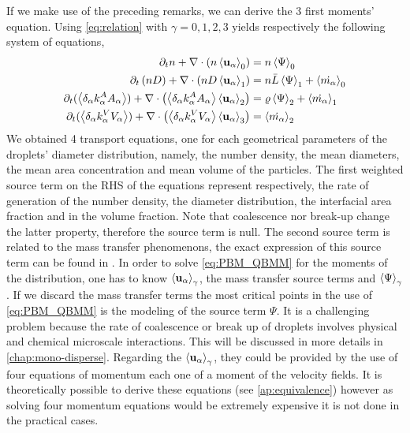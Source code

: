 If we make use of the preceding remarks, we can derive the 3 first moments' equation. 
Using \ref{eq:relation} with $\gamma = 0,1,2,3$ yields respectively the following system of equations,
\begin{align}
    \label{eq:PBM_QBMM3}
    \pddt n  
    + \nablab \cdot \left(n\gavg[0]{\textbf{u}_\alpha}\right) 
    &= n\gavg[0]{\Psi}\\
    \label{eq:PBEsize}
    \pddt \left(nD\right)
    + \nablab \cdot \left(nD\gavg[1]{\textbf{u}_\alpha}\right) 
    &= n\bar{L}\gavg[1]{\Psi}+ \gavg[0]{\dot{m_\alpha}} \\
    \label{eq:PBEarea} 
    \pddt ( \pavg{k_\alpha^A A_\alpha} ) 
    + \nablab \cdot \left( \pavg{k_\alpha^A A_\alpha} \gavg[2]{\textbf{u}_\alpha}\right) 
    &= \varrho\gavg[2]{\Psi} + \gavg[1]{\dot{m_\alpha}}\\
    \label{eq:PBEmass}
    \pddt (\pavg{ k_\alpha^V  V_\alpha} )
    + \nablab \cdot \left( \pavg{k_\alpha^V V_\alpha}  \gavg[3]{\textbf{u}_\alpha}\right) 
    &=  \gavg[2]{\dot{m_\alpha}}
\end{align}
We obtained 4 transport equations, one for each geometrical parameters of the droplets' diameter distribution, namely, the number density, the mean diameters, the mean area concentration and mean volume of the particles.
The first weighted source term on the RHS of the equations represent respectively, the rate of generation of the number density, the diameter distribution, the interfacial area fraction and in the volume fraction. 
Note that coalescence nor break-up change the latter property, therefore the source term is null. 
The second source term is related to the mass transfer phenomenons, the exact expression of this source term can be found in \citep{zaepffel2011modelisation}. 
In order to solve \ref{eq:PBM_QBMM} for the moments of the distribution, one has to know $\left<\textbf{u}_\alpha\right>_{\gamma}$, the mass transfer source terms and $\left<\Psi\right>_{\gamma}$.
If we discard the mass transfer terms the most critical points in the use of \ref{eq:PBM_QBMM} is the modeling of the source term $\Psi$.
It is a challenging problem because the rate of coalescence or break up of droplets involves physical and chemical microscale interactions.
This will be discussed in more details in \ref{chap:mono-disperse}.
Regarding the $\left<\textbf{u}_\alpha\right>_{\gamma}$, they could be provided by the use of four equations of momentum each one of a moment of the velocity fields.  
It is theoretically possible to derive these equations (see \ref{ap:equivalence}) however as solving four momentum equations would be extremely expensive it is not done in the practical cases. 
